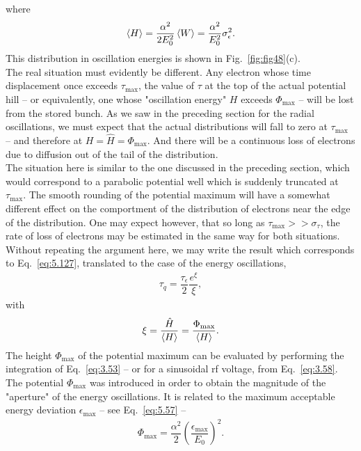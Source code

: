 where
\begin{align}
	\left< H \right> = \dfrac{\alpha^2}{2 E_0^2} \left< W \right> = \dfrac{\alpha^2}{E_0^2} \sigma_\epsilon^2.
\end{align}
This distribution in oscillation energies is shown in Fig.~\ref{fig:fig48}(c).\\
The real situation must evidently be different. Any electron whose time displacement once exceeds $\tau_\text{max}$, the value of $\tau$ at the top of the actual potential hill -- or equivalently, one whose "oscillation energy" $H$ exceeds $\Phi_\text{max}$ -- will be lost from the stored bunch. As we saw in the preceding section for the radial oscillations, we must expect that the actual distributions will fall to zero at $\tau_\text{max}$ -- and therefore at $H = \hat{H} = \Phi_\text{max}$. And there will be a continuous loss of electrons due to diffusion
 out of the tail of the distribution.\\
The situation here is similar to the one discussed in the preceding section, which would correspond to a parabolic potential well which is suddenly truncated at $\tau_\text{max}$. The smooth rounding of the potential maximum will have a somewhat different effect on the comportment of the distribution of electrons near the edge of the distribution. One may expect however, that so long as $\tau_\text{max} >> \sigma_\tau$, the rate of loss of electrons may be estimated in the same way for both situations.\\
Without repeating the argument here, we may write the result which corresponds to Eq.~\eqref{eq:5.127}, translated to the case of the energy oscillations,
\begin{align}
	\tau_q = \dfrac{\tau_\epsilon}{2} \dfrac{e^\xi}{\xi},
\end{align}
with
\begin{align}
	\xi = \dfrac{\hat{H}}{\left< H \right>} = \dfrac{\Phi_\text{max}}{\left< H \right>}.
\end{align}
The height $\Phi_\text{max}$ of the potential maximum can be evaluated by performing the integration of Eq.~\eqref{eq:3.53} -- or for a sinusoidal rf voltage, from Eq.~\eqref{eq:3.58}.\\
The potential $\Phi_\text{max}$ was introduced in order to obtain the magnitude of the "aperture"
 of the energy oscillations. It is related to the maximum acceptable energy deviation $\epsilon_\text{max}$ -- see Eq.~\eqref{eq:5.57} --
\begin{align}
	\Phi_\text{max} = \dfrac{\alpha^2}{2} \left( \dfrac{\epsilon_\text{max}}{E_0} \right)^2.
\end{align}
